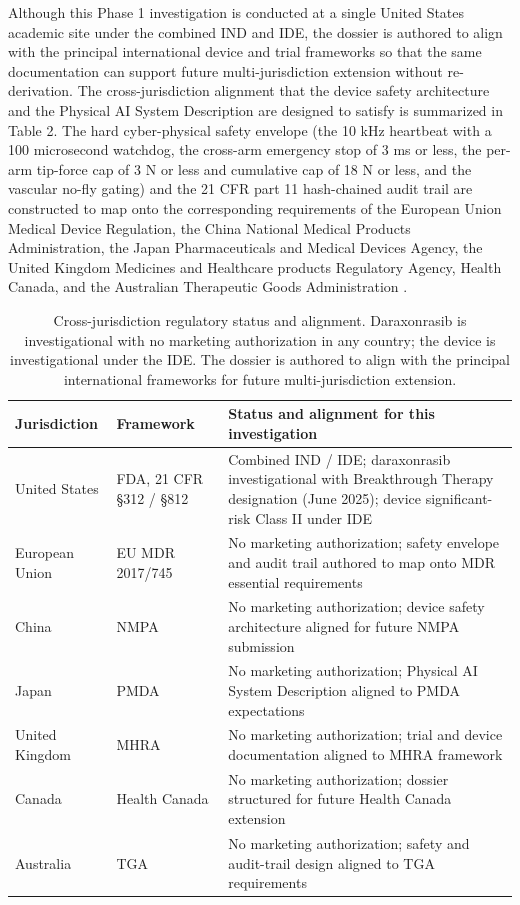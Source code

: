 Although this Phase 1 investigation is conducted at a single United States academic
site under the combined IND and IDE, the dossier is authored to align with the
principal international device and trial frameworks so that the same documentation
can support future multi-jurisdiction extension without re-derivation. The
cross-jurisdiction alignment that the device safety architecture and the
Physical AI System Description are designed to satisfy is summarized in Table 2. The
hard cyber-physical safety envelope (the 10 kHz heartbeat with a 100 microsecond
watchdog, the cross-arm emergency stop of 3 ms or less, the per-arm tip-force cap of
3 N or less and cumulative cap of 18 N or less, and the vascular no-fly gating) and
the 21 CFR part 11 hash-chained audit trail are constructed to map onto the
corresponding requirements of the European Union Medical Device Regulation, the
China National Medical Products Administration, the Japan Pharmaceuticals and
Medical Devices Agency, the United Kingdom Medicines and Healthcare products
Regulatory Agency, Health Canada, and the Australian Therapeutic Goods
Administration \cite{natlpaiplatf, cfr312paiuni}.

\begin{table}[t]
\caption{Cross-jurisdiction regulatory status and alignment. Daraxonrasib is
investigational with no marketing authorization in any country; the device is
investigational under the IDE. The dossier is authored to align with the principal
international frameworks for future multi-jurisdiction extension.}
\label{tab:sec02-jurisdiction}
\centering
\begin{tabularx}{\textwidth}{L{2.6cm} L{3.4cm} Y}
\toprule
\textbf{Jurisdiction} & \textbf{Framework} & \textbf{Status and alignment for this investigation} \\
\midrule
United States & FDA, 21 CFR \S 312 / \S 812 & Combined IND / IDE; daraxonrasib investigational with Breakthrough Therapy designation (June 2025); device significant-risk Class II under IDE \\
European Union & EU MDR 2017/745 & No marketing authorization; safety envelope and audit trail authored to map onto MDR essential requirements \\
China & NMPA & No marketing authorization; device safety architecture aligned for future NMPA submission \\
Japan & PMDA & No marketing authorization; Physical AI System Description aligned to PMDA expectations \\
United Kingdom & MHRA & No marketing authorization; trial and device documentation aligned to MHRA framework \\
Canada & Health Canada & No marketing authorization; dossier structured for future Health Canada extension \\
Australia & TGA & No marketing authorization; safety and audit-trail design aligned to TGA requirements \\
\bottomrule
\end{tabularx}
\end{table}

